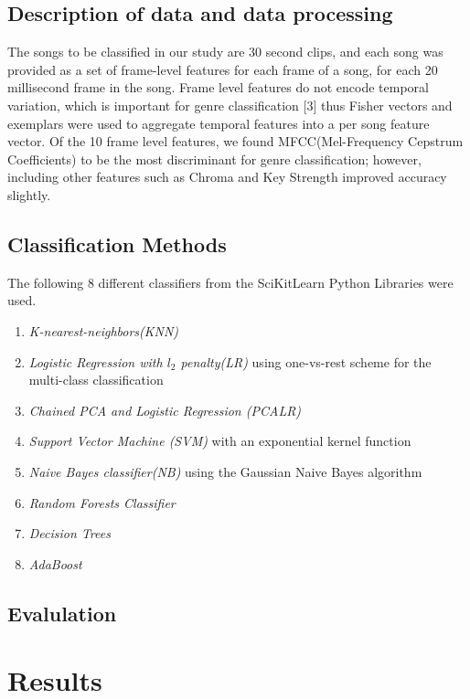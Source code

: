 \documentclass{article}
\begin{document}
\subsection{Description of data and data processing}
The songs to be classified in our study are 30 second clips, and each song was provided as a set of frame-level features for each frame of a song, for each 20 millisecond frame in the song. Frame level features do not encode temporal variation, which is important for genre classification [3] thus
Fisher vectors and exemplars were used to aggregate temporal features into a per song feature vector. Of the 10 frame level features, we found MFCC(Mel-Frequency Cepstrum Coefficients) to be the most discriminant for genre classification; however, including other features such as Chroma and Key Strength improved accuracy slightly.

\subsection{Classification Methods}

The following 8 different classifiers from the SciKitLearn Python Libraries were used. 
\begin{enumerate}
    \item \textit{K-nearest-neighbors(KNN)} 
    \item \textit{Logistic Regression with $l_2$ penalty(LR)} using one-vs-rest scheme for the multi-class classification
    \item \textit{Chained PCA and Logistic Regression (PCALR)}
    \item \textit{Support Vector Machine (SVM)} with an exponential kernel function
    \item \textit{Naive Bayes classifier(NB)} using the Gaussian Naive Bayes algorithm
    \item \textit{Random Forests Classifier}
    \item \textit{Decision Trees} 
    \item \textit{AdaBoost}
\end{enumerate}

\subsection{Evalulation}

\section{Results}
\end{document}
